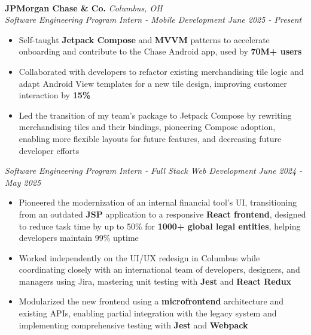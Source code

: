 \documentclass[letterpaper]{article}
\newcommand{\header}[2][]{%
    \vspace*{4pt}%
    \noindent\makebox[\linewidth]{\textsc{#2}%
    \ifx\\#1\\%
        \hfill%
    \else
        \hfill {\small\textit{#1}}%
    \fi}%
    \vspace*{-6pt}\\\hrulefill
}
\newenvironment{tightitemize}{%
  \begin{itemize}\small\setlength{\baselineskip}{0.95\baselineskip}\itemsep -1mm%
}{\end{itemize}}
\begin{document}
\header{Work Experience}
\vspace{1mm}

    \textbf{JPMorgan Chase \& Co.} \hfill \textsl{Columbus, OH}\\
    
    \textit{Software Engineering Program Intern - Mobile Development} \hfill \textsl{June 2025 - Present}\\
    \vspace{-7pt}
    \begin{tightitemize} \itemsep -1mm

            \item Self-taught \textbf{Jetpack Compose} and \textbf{MVVM} patterns to accelerate onboarding and contribute to the Chase Android app, used by \textbf{70M+ users}
            
            \item Collaborated with developers to refactor existing merchandising tile logic and adapt Android View templates for a new tile design, improving customer interaction by \textbf{15\%}
            
            \item Led the transition of my team's package to Jetpack Compose by rewriting merchandising tiles and their bindings, pioneering Compose adoption, enabling more flexible layouts for future features, and decreasing future developer efforts
                    
    \end{tightitemize}
    \textit{Software Engineering Program Intern - Full Stack Web Development} \hfill \textsl{June 2024 - May 2025}\\
    \vspace{-7pt}
    \begin{tightitemize} \itemsep -1mm

            \item Pioneered the modernization of an internal financial tool's UI, transitioning from an outdated \textbf{JSP} application to a responsive \textbf{React frontend}, designed to reduce task time by up to 50\% for \textbf{1000+ global legal entities}, helping developers maintain 99\% uptime

            \item Worked independently on the UI/UX redesign in Columbus while coordinating closely with an international team of developers, designers, and managers using Jira, mastering unit testing with \textbf{Jest} and \textbf{React Redux}

            \item Modularized the new frontend using a \textbf{microfrontend} architecture and existing APIs, enabling partial integration with the legacy system and implementing comprehensive testing with \textbf{Jest} and \textbf{Webpack}
                    
    \end{tightitemize}
    \vspace{-2mm}
\end{document}
